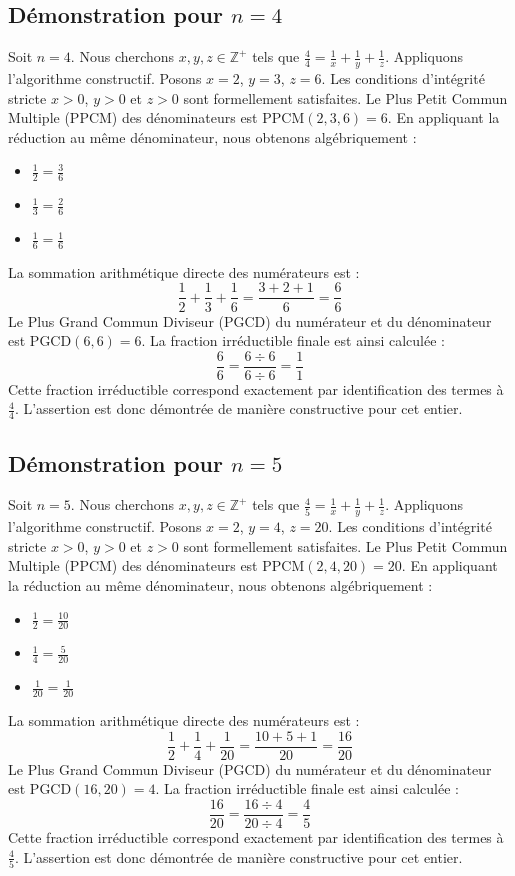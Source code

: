 \documentclass[11pt,a4paper]{article}
\begin{document}
\subsection{Démonstration pour $n = 4$}
Soit $n = 4$. Nous cherchons $x, y, z \in \mathbb{Z}^{+}$ tels que $\frac{4}{4} = \frac{1}{x} + \frac{1}{y} + \frac{1}{z}$.
Appliquons l'algorithme constructif. Posons $x = 2$, $y = 3$, $z = 6$.
Les conditions d'intégrité stricte $x > 0$, $y > 0$ et $z > 0$ sont formellement satisfaites.
Le Plus Petit Commun Multiple (PPCM) des dénominateurs est $\text{PPCM}(2, 3, 6) = 6$.
En appliquant la réduction au même dénominateur, nous obtenons algébriquement :
\begin{itemize}
    \item $\frac{1}{2} = \frac{3}{6}$
    \item $\frac{1}{3} = \frac{2}{6}$
    \item $\frac{1}{6} = \frac{1}{6}$
\end{itemize}
La sommation arithmétique directe des numérateurs est :
$$ \frac{1}{2} + \frac{1}{3} + \frac{1}{6} = \frac{3 + 2 + 1}{6} = \frac{6}{6} $$
Le Plus Grand Commun Diviseur (PGCD) du numérateur et du dénominateur est $\text{PGCD}(6, 6) = 6$.
La fraction irréductible finale est ainsi calculée :
$$ \frac{6}{6} = \frac{6 \div 6}{6 \div 6} = \frac{1}{1} $$
Cette fraction irréductible correspond exactement par identification des termes à $\frac{4}{4}$. L'assertion est donc démontrée de manière constructive pour cet entier.

\subsection{Démonstration pour $n = 5$}
Soit $n = 5$. Nous cherchons $x, y, z \in \mathbb{Z}^{+}$ tels que $\frac{4}{5} = \frac{1}{x} + \frac{1}{y} + \frac{1}{z}$.
Appliquons l'algorithme constructif. Posons $x = 2$, $y = 4$, $z = 20$.
Les conditions d'intégrité stricte $x > 0$, $y > 0$ et $z > 0$ sont formellement satisfaites.
Le Plus Petit Commun Multiple (PPCM) des dénominateurs est $\text{PPCM}(2, 4, 20) = 20$.
En appliquant la réduction au même dénominateur, nous obtenons algébriquement :
\begin{itemize}
    \item $\frac{1}{2} = \frac{10}{20}$
    \item $\frac{1}{4} = \frac{5}{20}$
    \item $\frac{1}{20} = \frac{1}{20}$
\end{itemize}
La sommation arithmétique directe des numérateurs est :
$$ \frac{1}{2} + \frac{1}{4} + \frac{1}{20} = \frac{10 + 5 + 1}{20} = \frac{16}{20} $$
Le Plus Grand Commun Diviseur (PGCD) du numérateur et du dénominateur est $\text{PGCD}(16, 20) = 4$.
La fraction irréductible finale est ainsi calculée :
$$ \frac{16}{20} = \frac{16 \div 4}{20 \div 4} = \frac{4}{5} $$
Cette fraction irréductible correspond exactement par identification des termes à $\frac{4}{5}$. L'assertion est donc démontrée de manière constructive pour cet entier.
\end{document}
